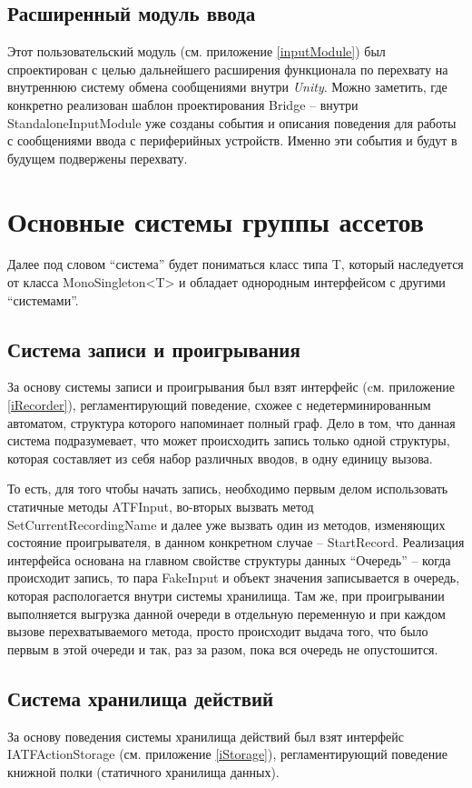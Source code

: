 \subsection{Расширенный модуль ввода}
Этот пользовательский модуль (см. приложение \ref{inputModule}) был спроектирован с целью дальнейшего расширения функционала по перехвату на внутреннюю систему обмена сообщениями внутри \textit{Unity}. Можно заметить, где конкретно реализован шаблон проектирования Bridge -- внутри StandaloneInputModule уже созданы события и описания поведения для работы с сообщениями ввода с периферийных устройств. Именно эти события и будут в будущем подвержены перехвату.

\section{Основные системы группы ассетов}
Далее под словом ``система'' будет пониматься класс типа T, который наследуется от класса MonoSingleton<T> и обладает однородным интерфейсом с другими ``системами''.

\subsection{Система записи и проигрывания}
За основу системы записи и проигрывания был взят интерфейс (cм. приложение \ref{iRecorder}), регламентирующий поведение, схожее с недетерминированным автоматом, структура которого напоминает полный граф. Дело в том, что данная система подразумевает, что может происходить запись только одной структуры, которая составляет из себя набор различных вводов, в одну единицу вызова.

То есть, для того чтобы начать запись, необходимо первым делом использовать статичные методы ATFInput, во-вторых вызвать метод SetCurrentRecordingName и далее уже вызвать один из методов, изменяющих состояние проигрывателя, в данном конкретном случае -- StartRecord. Реализация интерфейса основана на главном свойстве структуры данных ``Очередь'' -- когда происходит запись, то пара FakeInput и объект значения записывается в очередь, которая распологается внутри системы хранилища. Там же, при проигрывании выполняется выгрузка данной очереди в отдельную переменную и при каждом вызове перехватываемого метода, просто происходит выдача того, что было первым в этой очереди и так, раз за разом, пока вся очередь не опустошится.

\subsection{Система хранилища действий}
За основу поведения системы хранилища действий был взят интерфейс IATFActionStorage (см. приложение \ref{iStorage}), регламентирующий поведение книжной полки (статичного хранилища данных).

